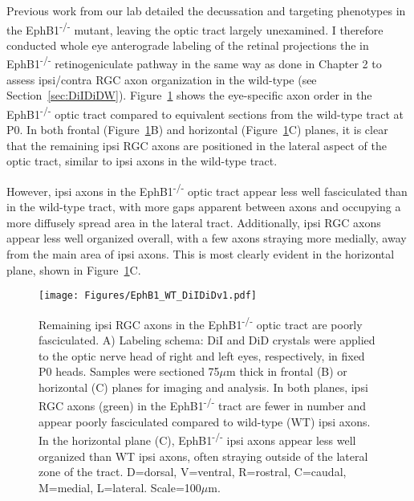 \label{sec:DiIDiDEphB1}
Previous work from our lab detailed the decussation and targeting phenotypes in the EphB1\textsuperscript{-/-} mutant, leaving the optic tract largely unexamined.
I therefore conducted whole eye anterograde labeling of the retinal projections the in EphB1\textsuperscript{-/-} retinogeniculate pathway in the same way as done in Chapter 2 to assess ipsi/contra RGC axon organization in the wild-type (see Section~\ref{sec:DiIDiDW}). 
Figure~\ref{EphB1WTDiIDiD} shows the eye-specific axon order in the EphB1\textsuperscript{-/-} optic tract compared to equivalent sections from the wild-type tract at P0.
In both frontal (Figure~\ref{EphB1WTDiIDiD}B) and horizontal (Figure~\ref{EphB1WTDiIDiD}C) planes, it is clear that the remaining ipsi RGC axons are positioned in the lateral aspect of the optic tract, similar to ipsi axons in the wild-type tract.

However, ipsi axons in the EphB1\textsuperscript{-/-} optic tract appear less well fasciculated than in the wild-type tract, with more gaps apparent between axons and occupying a more diffusely spread area in the lateral tract.
Additionally, ipsi RGC axons appear less well organized overall, with a few axons straying more medially, away from the main area of ipsi axons.
This is most clearly evident in the horizontal plane, shown in Figure~\ref{EphB1WTDiIDiD}C.
\begin{figure}[hbtp]
    \begin{center}
        \texttt{[image: Figures/EphB1\_WT\_DiIDiDv1.pdf]}
        \caption[Remaining ipsi RGC axons in the EphB1\textsuperscript{-/-} optic tract are poorly fasciculated.]
        {Remaining ipsi RGC axons in the EphB1\textsuperscript{-/-} optic tract are poorly fasciculated.
		A) Labeling schema: DiI and DiD crystals were applied to the optic nerve head of right and left eyes, respectively, in fixed P0 heads.
		Samples were sectioned 75$\mu$m thick in frontal (B) or horizontal (C) planes for imaging and analysis.
		In both planes, ipsi RGC axons (green) in the EphB1\textsuperscript{-/-} tract are fewer in number and appear poorly fasciculated compared to wild-type (WT) ipsi axons.
		In the horizontal plane (C), EphB1\textsuperscript{-/-} ipsi axons appear less well organized than WT ipsi axons, often straying outside of the lateral zone of the tract.
		D=dorsal, V=ventral, R=rostral, C=caudal, M=medial, L=lateral.
		Scale=100$\mu$m.
		}
        \label{EphB1WTDiIDiD}
    \end{center}
\end{figure}

